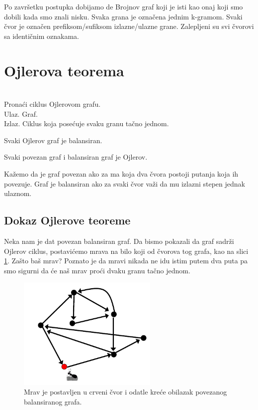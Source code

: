 Po završetku postupka dobijamo de Brojnov graf koji je isti kao onaj koji smo dobili kada smo znali nisku. Svaka grana je označena jednim k-gramom. Svaki čvor je označen prefiksom/sufiksom izlazne/ulazne grane. Zalepljeni su svi čvorovi sa identičnim oznakama.

\section{Ojlerova teorema}

\begin{problem}
	~\\ Pronaći ciklus Ojlerovom grafu.
	\\ Ulaz. Graf.
	\\ Izlaz. Ciklus koja posećuje svaku granu tačno jednom.
\end{problem}

Svaki Ojlerov graf je balansiran.

\begin{teorema}
	Svaki povezan graf i balansiran graf je Ojlerov.
\end{teorema}

Kažemo da je graf povezan ako za ma koja dva čvora postoji putanja koja ih povezuje. Graf je balansiran ako za svaki čvor važi da mu izlazni stepen jednak ulaznom.


\subsection{Dokaz Ojlerove teoreme}

Neka nam je dat povezan balansiran graf. Da bismo pokazali da graf sadrži Ojlerov ciklus, postavićemo mrava na bilo koji od čvorova tog grafa, kao na slici \ref{slika:mrav1}. Zašto baš mrav? Poznato je da mravi nikada ne idu istim putem dva puta pa smo sigurni da će naš mrav proći dvaku granu tačno jednom.

\begin{figure}[H]
	\centering
	\includegraphics[width=0.6\textwidth]{poglavlja/3/slike/mrav1.png}
	\caption{Mrav je postavljen u crveni čvor i odatle kreće obilazak povezanog balansiranog grafa.}
	\label{slika:mrav1}
\end{figure} 

